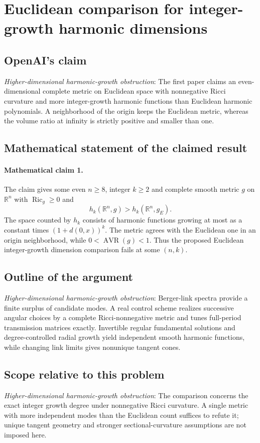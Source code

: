 \documentclass[11pt]{article}
\begin{document}
\section*{Euclidean comparison for integer-growth harmonic dimensions}

\subsection{OpenAI's claim}
\textit{Higher-dimensional harmonic-growth obstruction}: The first paper claims an even-dimensional complete metric on Euclidean space with nonnegative Ricci curvature and more integer-growth harmonic functions than Euclidean harmonic polynomials. A neighborhood of the origin keeps the Euclidean metric, whereas the volume ratio at infinity is strictly positive and smaller than one.

\subsection{Mathematical statement of the claimed result}
\paragraph{Mathematical claim 1.} The claim gives some even $n\ge8$, integer $k\ge2$ and complete smooth metric $g$ on $\mathbb R^n$ with $\operatorname{Ric}_g\ge0$ and \[h_k(\mathbb R^n,g)>h_k(\mathbb R^n,g_E).\] The space counted by $h_k$ consists of harmonic functions growing at most as a constant times $(1+d(0,x))^k$. The metric agrees with the Euclidean one in an origin neighborhood, while $0<\operatorname{AVR}(g)<1$. Thus the proposed Euclidean integer-growth dimension comparison fails at some $(n,k)$.

\subsection{Outline of the argument}
\textit{Higher-dimensional harmonic-growth obstruction}: Berger-link spectra provide a finite surplus of candidate modes. A real control scheme realizes successive angular choices by a complete Ricci-nonnegative metric and tunes full-period transmission matrices exactly. Invertible regular fundamental solutions and degree-controlled radial growth yield independent smooth harmonic functions, while changing link limits gives nonunique tangent cones.

\subsection{Scope relative to this problem}
\textit{Higher-dimensional harmonic-growth obstruction}: The comparison concerns the exact integer growth degree under nonnegative Ricci curvature. A single metric with more independent modes than the Euclidean count suffices to refute it; unique tangent geometry and stronger sectional-curvature assumptions are not imposed here.
\end{document}
